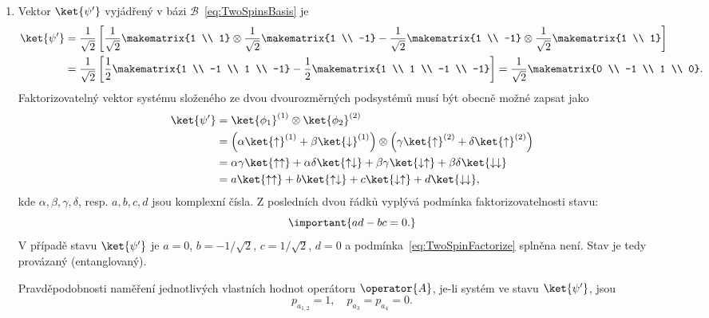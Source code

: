 \begin{solution}
\begin{enumerate}
	\item
		Vektor $\ket{\psi'}$ vyjádřený v bázi $\mathcal{B}$~\eqref{eq:TwoSpinsBasis} je
		\begin{align}
			\ket{\psi'}
				&=\frac{1}{\sqrt{2}}\left[
					\frac{1}{\sqrt{2}}\makematrix{1 \\ 1}\otimes\frac{1}{\sqrt{2}}\makematrix{1 \\ -1}
					-\frac{1}{\sqrt{2}}\makematrix{1 \\ -1}\otimes\frac{1}{\sqrt{2}}\makematrix{1 \\ 1}\right]\nonumber\\
				&=\frac{1}{\sqrt{2}}\left[\frac{1}{2}\makematrix{1 \\ -1 \\ 1 \\ -1}-\frac{1}{2}\makematrix{1 \\ 1 \\ -1 \\ -1}\right]
				 =\frac{1}{\sqrt{2}}\makematrix{0 \\ -1 \\ 1 \\ 0}.
        \end{align}
        Faktorizovatelný vektor systému složeného ze dvou dvourozměrných podsystémů musí být obecně možné zapsat jako
        \begin{align}
            \ket{\psi'}
                &=\ket{\phi_{1}}^{(1)}\otimes\ket{\phi_{2}}^{(2)}\nonumber\\
                &=\left(\alpha\ket{\uparrow}^{(1)}+\beta\ket{\downarrow}^{(1)}\right)\otimes\left(\gamma\ket{\uparrow}^{(2)}+\delta\ket{\uparrow}^{(2)}\right)\nonumber\\
                &=\alpha\gamma\ket{\uparrow\uparrow}+\alpha\delta\ket{\uparrow\downarrow}+\beta\gamma\ket{\downarrow\uparrow}+\beta\delta\ket{\downarrow\downarrow}\nonumber\\
                &=a\ket{\uparrow\uparrow}+b\ket{\uparrow\downarrow}+c\ket{\downarrow\uparrow}+d\ket{\downarrow\downarrow},
        \end{align}
        kde $\alpha,\beta,\gamma,\delta$, resp. $a,b,c,d$ jsou komplexní čísla.
        Z posledních dvou řádků vyplývá podmínka faktorizovatelnosti stavu:
        \begin{equation}
            \important{ad-bc=0.}
            \label{eq:TwoSpinFactorize}
        \end{equation}
        V případě stavu $\ket{\psi'}$ je $a=0$, $b=-1/\sqrt{2}$, $c=1/\sqrt{2}$, $d=0$ a podmínka~\eqref{eq:TwoSpinFactorize} splněna není.
        Stav je tedy provázaný (entanglovaný).

		Pravděpodobnosti naměření jednotlivých vlastních hodnot operátoru $\operator{A}$, je-li systém ve stavu $\ket{\psi'}$, jsou
		\begin{equation}
            p_{a_{1,2}}
                =1,\quad
            p_{a_{3}}
                =p_{a_{4}}
                =0.
		\end{equation}		
	\end{enumerate}
\end{solution}
